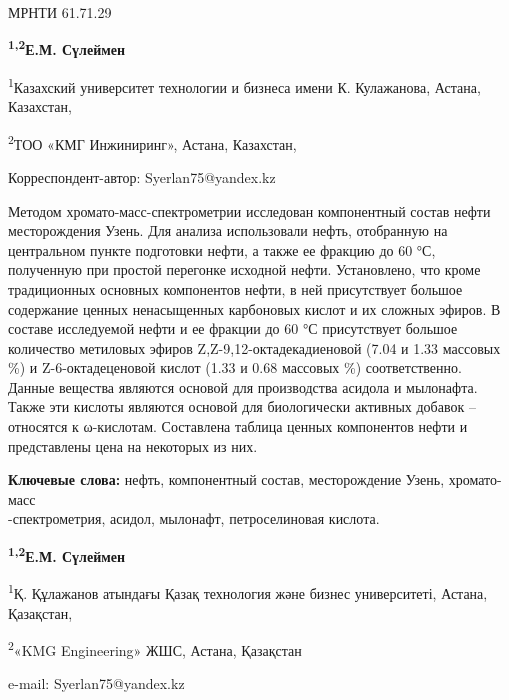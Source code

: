 \newpage
МРНТИ 61.71.29


\begin{center}
{\bfseries \textsuperscript{1,2}Е.М. Сүлеймен}

\textsuperscript{1}Казахский университет технологии и бизнеса имени К.
Кулажанова, Астана, Казахстан,

\textsuperscript{2}ТОО «КМГ Инжиниринг», Астана, Казахстан,
\end{center}
\envelope Корреспондент-автор: Syerlan75@yandex.kz

Методом хромато-масс-спектрометрии исследован компонентный состав нефти
месторождения Узень. Для анализа использовали нефть, отобранную на
центральном пункте подготовки нефти, а также ее фракцию до 60 °С,
полученную при простой перегонке исходной нефти. Установлено, что кроме
традиционных основных компонентов нефти, в ней присутствует большое
содержание ценных ненасыщенных карбоновых кислот и их сложных эфиров. В
составе исследуемой нефти и ее фракции до 60 °С присутствует большое
количество метиловых эфиров Z,Z-9,12-октадекадиеновой (7.04 и 1.33
массовых \%) и Z-6-октадеценовой кислот (1.33 и 0.68 массовых \%)
соответственно. Данные вещества являются основой для производства
асидола и мылонафта. Также эти кислоты являются основой для биологически
активных добавок -- относятся к ω-кислотам. Составлена таблица ценных
компонентов нефти и представлены цена на некоторых из них.

{\bfseries Ключевые слова:} нефть, компонентный состав, месторождение
Узень, хромато-масс\\-спектрометрия, асидол, мылонафт, петроселиновая
кислота.


\begin{center}
{\bfseries \textsuperscript{1,2}Е.М. Сүлеймен}

\textsuperscript{1}Қ. Құлажанов атындағы Қазақ технология және бизнес
университеті, Астана, Қазақстан,

\textsuperscript{2}«KMG Engineering» ЖШС, Астана, Қазақстан

e-mail: Syerlan75@yandex.kz
\end{center}

